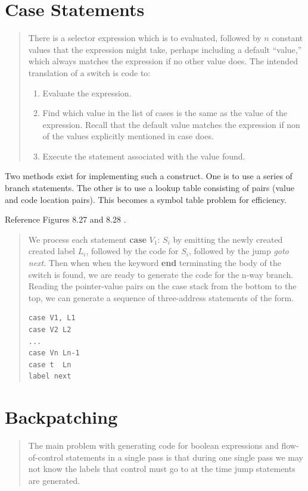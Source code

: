 \documentclass[11pt]{article}
\begin{document}
\section {Case Statements}
\begin{quote}
There is a selector expression which is to evaluated, followed by $n$ constant values that the expression might take, perhaps including a default ``value,'' which always matches the expression if no other value does.  The intended translation of a switch is code to:
\begin{enumerate}
\item Evaluate the expression.
\item Find which value in the list of cases is the same as the value of the expression.  Recall that the default value matches the expression if non of the values explicitly mentioned in case does.  
\item Execute the statement associated with the value found.   
\end{enumerate}
\end{quote}

Two methods exist for implementing such a construct.  One is to use a series of branch statements.  The other is to use a lookup table consisting of pairs (value and code location pairs).    This becomes a symbol table problem for efficiency.  

Reference Figures 8.27 and 8.28  .  

\begin{quote}
We process each statement \textbf{case} $V_1$: $S_i$ by emitting the newly created created label $L_i$, followed by the code for $S_i$, followed by the jump \textsl{goto next}.  Then when when the keyword \textbf{end} terminating the body of the switch is found, we are ready to generate the code for the n-way branch.  Reading the pointer-value pairs on the case stack from the bottom to the top, we can generate a sequence of three-address statements of the form.
\begin{lstlisting}
case V1, L1
case V2 L2
...
case Vn Ln-1
case t  Ln
label next
\end{lstlisting}
\end{quote}

\newpage
\section {Backpatching}
\begin {quote}
The main problem with generating code for boolean expressions and flow-of-control statements in a single pass is that during one single pass we may not know the labels that control must go to at the time jump statements are generated.  
\end{quote}
\end{document}
